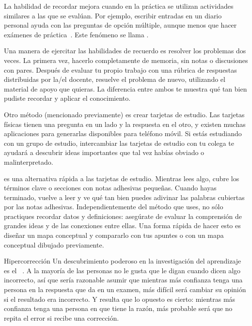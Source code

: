 La habilidad de recordar mejora cuando en la práctica se utilizan actividades similares a las que se evalúan.
Por ejemplo,
escribir entradas en un diario personal ayuda con las preguntas de opción múltiple,
aunque menos que hacer exámenes de práctica~\cite{Mill2016a}.
Este fenómeno se llama
.

Una manera de ejercitar las habilidades de recuerdo es resolver los problemas dos veces.
La primera vez,
hacerlo completamente de memoria, sin notas o discusiones con pares.
Después de evaluar tu propio trabajo con una rúbrica de respuestas distribuidas por la/el docente,
resuelve el problema de nuevo, utilizando el material de apoyo que quieras.
La diferencia entre ambos te muestra qué tan bien pudiste recordar y aplicar el conocimiento.

Otro método (mencionado previamente) es crear tarjetas de estudio.
Las tarjetas físicas tienen una pregunta en un lado y la respuesta en el otro,
y existen muchas aplicaciones para generarlas disponibles para teléfono móvil.
Si estás estudiando con un grupo de estudio,
intercambiar las tarjetas de estudio con tu colega
te ayudará a descubrir ideas importantes que tal vez habías obviado o malinterpretado.

es una alternativa rápida a las tarjetas de estudio.
Mientras lees algo,
cubre los términos clave o secciones con notas adhesivas pequeñas.
Cuando hayas terminado,
vuelve a leer y ve qué tan bien puedes adivinar las palabras cubiertas por las notas adhesivas.
Independientemente del método que uses,
no sólo practiques recordar datos y definiciones:
asegúrate de evaluar la comprensión de grandes ideas 
y de las conexiones entre ellas.
Una forma rápida de hacer esto es
diseñar un mapa conceptual y compararlo con tus apuntes
o con un mapa conceptual dibujado previamente.

\begin{aside}{Hipercorrección}
    Un descubrimiento poderoso en la investigación del aprendizaje es
  el ~\cite{Metc2016}.
  A la mayoría de las personas no le gusta que le digan cuando dicen algo incorrecto,
  así que sería razonable asumir que
  mientras más confianza tenga una persona en la respuesta que da en un examen,
  más difícil será cambiar su opinión si el resultado era incorrecto.
  Y resulta que lo opuesto es cierto:
  mientras más confianza tenga una persona en que tiene la razón,
  más probable será que no repita el error si recibe una corrección.
\end{aside}

